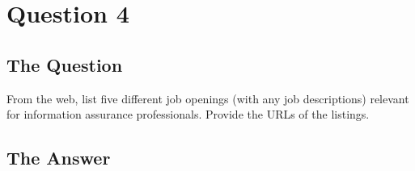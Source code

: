 \documentclass[11pt]{article}
\begin{document}
\section{\sc Question 4}

\subsection{The Question}

\begin{flushleft}

From the web, list five different job openings (with any job descriptions) relevant for information assurance professionals. Provide the URLs of the listings.

\end{flushleft}


\subsection{The Answer}
\end{document}
